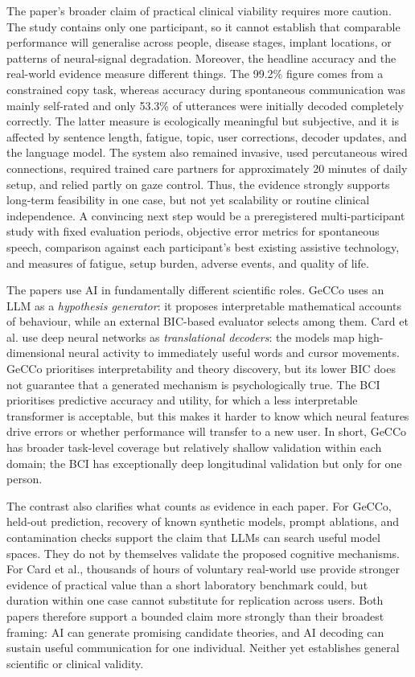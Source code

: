 The paper's broader claim of practical clinical viability requires more caution. The study contains only one participant, so it cannot establish that comparable performance will generalise across people, disease stages, implant locations, or patterns of neural-signal degradation. Moreover, the headline accuracy and the real-world evidence measure different things. The 99.2\% figure comes from a constrained copy task, whereas accuracy during spontaneous communication was mainly self-rated and only 53.3\% of utterances were initially decoded completely correctly. The latter measure is ecologically meaningful but subjective, and it is affected by sentence length, fatigue, topic, user corrections, decoder updates, and the language model. The system also remained invasive, used percutaneous wired connections, required trained care partners for approximately 20 minutes of daily setup, and relied partly on gaze control. Thus, the evidence strongly supports long-term feasibility in one case, but not yet scalability or routine clinical independence. A convincing next step would be a preregistered multi-participant study with fixed evaluation periods, objective error metrics for spontaneous speech, comparison against each participant's best existing assistive technology, and measures of fatigue, setup burden, adverse events, and quality of life.

The papers use AI in fundamentally different scientific roles. GeCCo uses an LLM as a \emph{hypothesis generator}: it proposes interpretable mathematical accounts of behaviour, while an external BIC-based evaluator selects among them. Card et al. use deep neural networks as \emph{translational decoders}: the models map high-dimensional neural activity to immediately useful words and cursor movements. GeCCo prioritises interpretability and theory discovery, but its lower BIC does not guarantee that a generated mechanism is psychologically true. The BCI prioritises predictive accuracy and utility, for which a less interpretable transformer is acceptable, but this makes it harder to know which neural features drive errors or whether performance will transfer to a new user. In short, GeCCo has broader task-level coverage but relatively shallow validation within each domain; the BCI has exceptionally deep longitudinal validation but only for one person.

The contrast also clarifies what counts as evidence in each paper. For GeCCo, held-out prediction, recovery of known synthetic models, prompt ablations, and contamination checks support the claim that LLMs can search useful model spaces. They do not by themselves validate the proposed cognitive mechanisms. For Card et al., thousands of hours of voluntary real-world use provide stronger evidence of practical value than a short laboratory benchmark could, but duration within one case cannot substitute for replication across users. Both papers therefore support a bounded claim more strongly than their broadest framing: AI can generate promising candidate theories, and AI decoding can sustain useful communication for one individual. Neither yet establishes general scientific or clinical validity.
